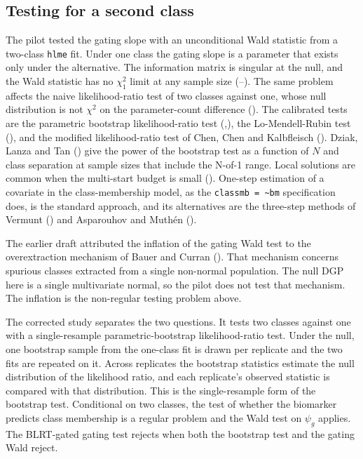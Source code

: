 \documentclass[
  11pt,
]{article}
\begin{document}
\subsection{Testing for a second class}\label{testing-for-a-second-class}

The pilot tested the gating slope with an unconditional Wald
statistic from a two-class \texttt{hlme} fit. Under one class the gating
slope is a parameter that exists only under the alternative. The
information matrix is singular at the null, and the Wald statistic
has no \(\chi^2_1\) limit at any sample size (--). The same problem affects the naive
likelihood-ratio test of two classes against one, whose null
distribution is not \(\chi^2\) on the parameter-count difference
(). The calibrated tests are the parametric
bootstrap likelihood-ratio test (,), the
Lo-Mendell-Rubin test (), and the modified likelihood-ratio
test of Chen, Chen and Kalbfleisch (). Dziak, Lanza
and Tan () give the power of the bootstrap test as a
function of \(N\) and class separation at sample sizes that include the
N-of-1 range. Local solutions are common when the multi-start budget
is small (). One-step estimation of a covariate in the
class-membership model, as the \texttt{classmb\ =\ \textasciitilde{}bm} specification does, is
the standard approach, and its alternatives are the three-step
methods of Vermunt () and Asparouhov and Muthén
().

The earlier draft attributed the inflation of the gating Wald test to
the overextraction mechanism of Bauer and Curran ().
That mechanism concerns spurious classes extracted from a single
non-normal population. The null DGP here is a single multivariate
normal, so the pilot does not test that mechanism. The inflation is
the non-regular testing problem above.

The corrected study separates the two questions. It tests two classes
against one with a single-resample parametric-bootstrap
likelihood-ratio test. Under the null, one bootstrap sample from the
one-class fit is drawn per replicate and the two fits are repeated on
it. Across replicates the bootstrap statistics estimate the null
distribution of the likelihood ratio, and each replicate's observed
statistic is compared with that distribution. This is the
single-resample form of the bootstrap test. Conditional on two
classes, the test of whether the biomarker predicts class membership
is a regular problem and the Wald test on \(\psi_g\) applies. The
BLRT-gated gating test rejects when both the bootstrap test and the
gating Wald reject.
\end{document}
